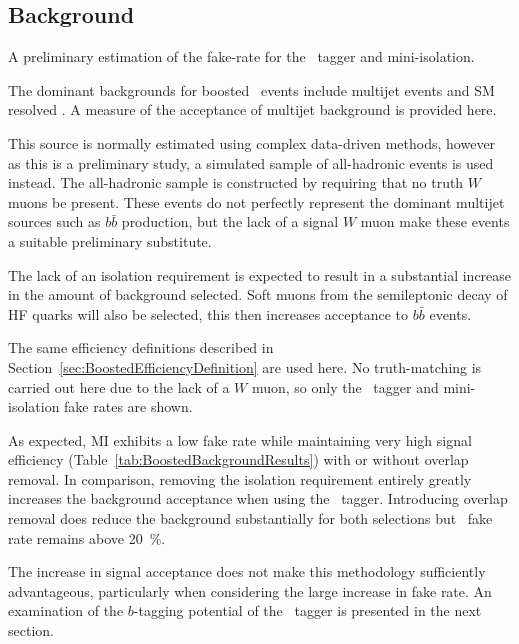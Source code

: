 \subsection{Background}

A preliminary estimation of the fake-rate for the \xsm\ tagger and mini-isolation.

The dominant backgrounds for boosted \ttbar\ events include multijet events and SM resolved \ttbar. A measure of the acceptance of multijet background is provided here. 

This source is normally estimated using complex data-driven methods, however as this is a preliminary study, a simulated sample of all-hadronic events is used instead. The all-hadronic sample is constructed by requiring that no truth $W$ muons be present. These events do not perfectly represent the dominant multijet sources such as $b\bar{b}$ production, but the lack of a signal $W$ muon make these events a suitable preliminary substitute. 

The lack of an isolation requirement is expected to result in a substantial increase in the amount of background selected. Soft muons from the semileptonic decay of HF quarks will also be selected, this then increases acceptance to $b\bar{b}$ events.

The same efficiency definitions described in Section~\ref{sec:BoostedEfficiencyDefinition} are used here. No truth-matching is carried out here due to the lack of a $W$ muon, so only the \xsm\ tagger and mini-isolation fake rates are shown. 

As expected, MI exhibits a low fake rate while maintaining very high signal efficiency (Table~\ref{tab:BoostedBackgroundResults}) with or without overlap removal. In comparison, removing the isolation requirement entirely greatly increases the background acceptance when using the \xsm\ tagger. Introducing overlap removal does reduce the background substantially for both selections but \xsm\ fake rate remains above \SI{20}{\percent}. 

The increase in signal acceptance does not make this methodology sufficiently advantageous, particularly when considering the large increase in fake rate. An examination of the $b$-tagging potential of the \xsm\ tagger is presented in the next section.

